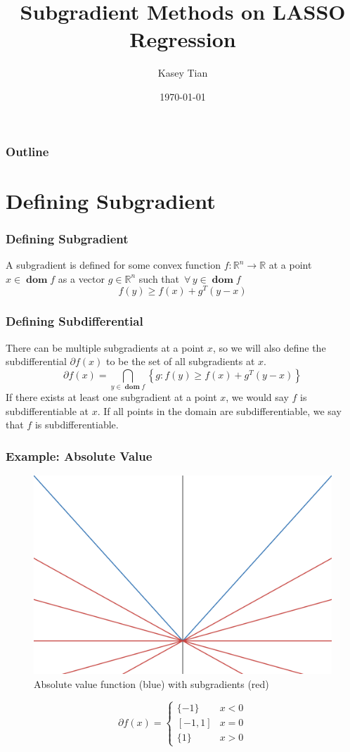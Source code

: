 \documentclass{beamer}
\title{
Subgradient Methods on LASSO Regression
}
\institute{16:332:509}
\author{Kasey Tian}
\date{\today}
\DeclareMathOperator{\dom}{\mathbf{dom}}
\let\oldforall\forall
\renewcommand{\forall}{ \, \oldforall \, }
\begin{document}
\begin{frame}
\titlepage
\end{frame}

\begin{frame}
\frametitle{Outline}
\tableofcontents
\end{frame}

\section{Defining Subgradient}
\begin{frame}
\frametitle{Defining Subgradient}
A subgradient is defined for some convex function \(f: \mathbb{R}^n \rightarrow \mathbb{R}\) at a point \(x \in \dom f\) as a vector \(g \in \mathbb{R}^n\) such that \(\forall y \in \dom f\) \cite{boydvandenberghesubgradient}
\begin{equation}\label{eq:subgradient def}
f(y) \geq f(x) + g^T (y-x) 
\end{equation}
\end{frame}

\begin{frame}
\frametitle{Defining Subdifferential}
There can be multiple subgradients at a point \(x\), so we will also define the subdifferential \(\partial f(x)\) to be the set of all subgradients at \(x\).
\begin{equation}\label{eq:math subdifferential}
\partial f(x) = \bigcap_{y \in \dom f} \left\{ g : f(y) \geq f(x) + g^T (y-x)\right\}
\end{equation}
If there exists at least one subgradient at a point \(x\), we would say \(f\) is subdifferentiable at \(x\). If all points in the domain are subdifferentiable, we say that \(f\) is subdifferentiable. \cite{boydvandenberghesubgradient}
\end{frame}

\begin{frame}
\frametitle{Example: Absolute Value}
\begin{figure}[htbp]
    \centering
    \includegraphics[width=0.5\linewidth]{../Report LaTeX/Figures/abs_subgradients.png}
    \caption{Absolute value function (blue) with subgradients (red)}
    \label{fig:abs subgradients}
\end{figure}
\begin{equation}\label{eq:abs subdifferential}
\partial f(x) = \begin{cases}
    \{-1\} & x < 0 \\
    [-1, 1] & x = 0\\
    \{1\} & x > 0
\end{cases}
\end{equation}
\end{frame}
\end{document}
